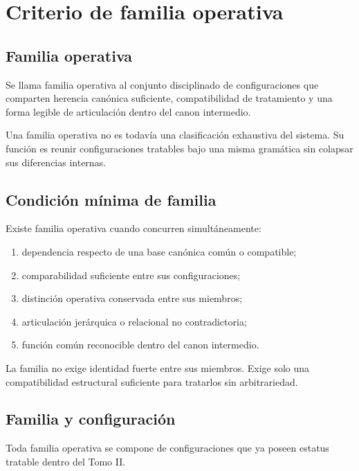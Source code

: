\chapter{Criterio de familia operativa}

\section{Familia operativa}
\begin{definition}
Se llama familia operativa al conjunto disciplinado de configuraciones que comparten herencia canónica suficiente, compatibilidad de tratamiento y una forma legible de articulación dentro del canon intermedio.
\end{definition}

\begin{observation}
Una familia operativa no es todavía una clasificación exhaustiva del sistema. Su función es reunir configuraciones tratables bajo una misma gramática sin colapsar sus diferencias internas.
\end{observation}

\section{Condición mínima de familia}
\begin{definition}
Existe familia operativa cuando concurren simultáneamente:
\begin{enumerate}
  \item dependencia respecto de una base canónica común o compatible;
  \item comparabilidad suficiente entre sus configuraciones;
  \item distinción operativa conservada entre sus miembros;
  \item articulación jerárquica o relacional no contradictoria;
  \item función común reconocible dentro del canon intermedio.
\end{enumerate}
\end{definition}

\begin{observation}
La familia no exige identidad fuerte entre sus miembros. Exige solo una compatibilidad estructural suficiente para tratarlos sin arbitrariedad.
\end{observation}

\section{Familia y configuración}
\begin{definition}
Toda familia operativa se compone de configuraciones que ya poseen estatus tratable dentro del Tomo II.
\end{definition}

